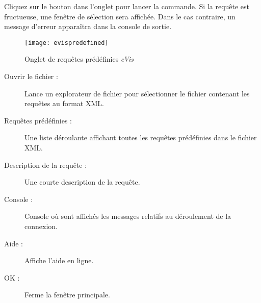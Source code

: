 Cliquez sur le bouton  dans l'onglet  pour lancer la commande. Si la requête est fructueuse, une fenêtre de sélection sera affichée. Dans le cas contraire, un message d'erreur apparaîtra dans la console de sortie.


\begin{figure}[ht]
   \begin{center}
\texttt{[image: evispredefined]}
\caption{Onglet de requêtes prédéfinies \emph{eVis} \nixcaption}\label{evispredefined}
\end{center}
\end{figure}


\begin{description}
\item[Ouvrir le fichier :] Lance un explorateur de fichier pour sélectionner le fichier contenant les requêtes au format XML.
\item[Requêtes prédéfinies :] Une liste déroulante affichant toutes les requêtes prédéfinies dans le fichier XML.
\item[Description de la requête :] Une courte description de la requête.
\item[Console :] Console où sont affichés les messages relatifs au déroulement de la connexion.
\item[Aide :] Affiche l'aide en ligne.
\item[OK :] Ferme la fenêtre principale.
\end{description}

